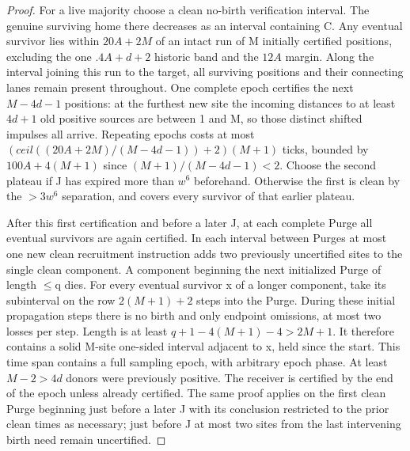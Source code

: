 \begin{proof}
For a live majority choose a clean no-birth verification interval. The genuine surviving home there decreases as an interval containing C. Any eventual survivor lies within \(20A+2M\) of an intact run of M initially certified positions, excluding the one \(.4A+d+2\) historic band and the \(12A\) margin. Along the interval joining this run to the target, all surviving positions and their connecting lanes remain present throughout. One complete epoch certifies the next \(M- 4d- 1\) positions: at the furthest new site the incoming distances to at least \(4d+1\) old positive sources are between 1 and M, so those distinct shifted impulses all arrive. Repeating epochs costs at most \((ceil((20A+2M)/(M- 4d- 1))+2)(M+1)\) ticks, bounded by \(100A+4(M+1)\) since \((M+1)/(M- 4d- 1)<2\). Choose the second plateau if J has expired more than \(w^6\) beforehand. Otherwise the first is clean by the \(>3w^6\) separation, and covers every survivor of that earlier plateau.

After this first certification and before a later J, at each complete Purge all eventual survivors are again certified. In each interval between Purges at most one new clean recruitment instruction adds two previously uncertified sites to the single clean component. A component beginning the next initialized Purge of length \(\le\)q dies. For every eventual survivor x of a longer component, take its subinterval on the row \(2(M+1)+2\) steps into the Purge. During these initial propagation steps there is no birth and only endpoint omissions, at most two losses per step. Length is at least \(q+1- 4(M+1)- 4>2M+1\). It therefore contains a solid M-site one-sided interval adjacent to x, held since the start. This time span contains a full sampling epoch, with arbitrary epoch phase. At least \(M- 2>4d\) donors were previously positive. The receiver is certified by the end of the epoch unless already certified. The same proof applies on the first clean Purge beginning just before a later J with its conclusion restricted to the prior clean times as necessary; just before J at most two sites from the last intervening birth need remain uncertified.


\end{proof}
